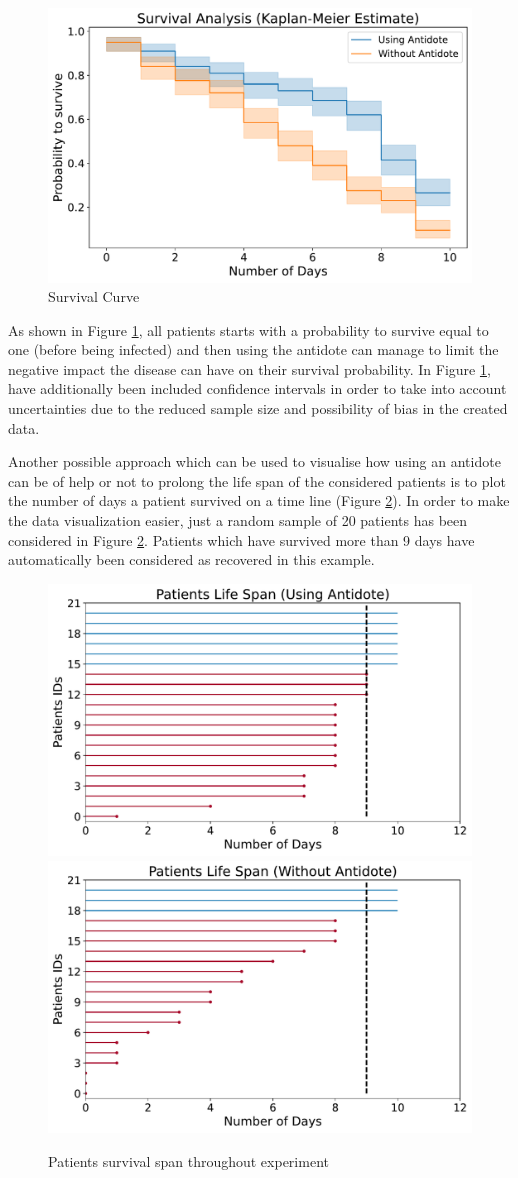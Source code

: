 \begin{figure}[ht!]%
    \centering
    \includegraphics[width=0.55\linewidth]{latex/images/survival.pdf}
    \vspace{-0.2cm}
    \caption{Survival Curve}
    \label{s_curve}
\end{figure}

As shown in Figure \ref{s_curve}, all patients starts with a probability to survive equal to one (before being infected) and then using the antidote can manage to limit the negative impact the disease can have on their survival probability. In Figure \ref{s_curve}, have additionally been included confidence intervals in order to take into account uncertainties due to the reduced sample size and possibility of bias in the created data.

Another possible approach which can be used to visualise how using an antidote can be of help or not to prolong the life span of the considered patients is to plot the number of days a patient survived on a time line (Figure \ref{span}). In order to make the data visualization easier, just a random sample of 20 patients has been considered in Figure \ref{span}. Patients which have survived more than 9 days have automatically been considered as recovered in this example.

\begin{figure}[ht!]%
    \centering
    \includegraphics[width=0.5\linewidth]{latex/images/survival_span.pdf}
    \includegraphics[width=0.49\linewidth]{latex/images/survival_span2.pdf}
    \vspace{-0.2cm}
    \caption{Patients survival span throughout experiment}
    \label{span}
\end{figure}

